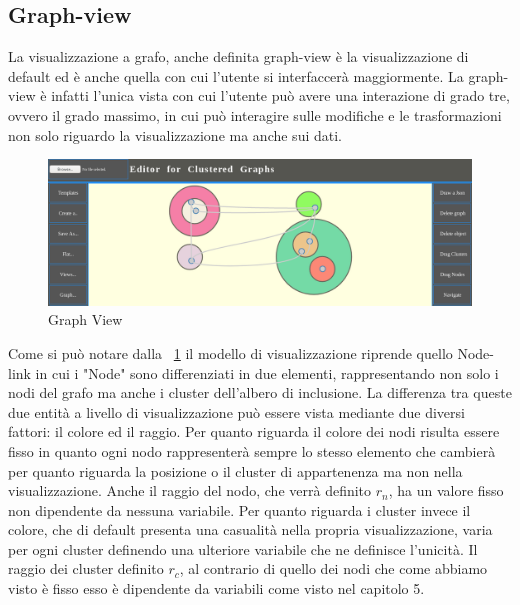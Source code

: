 {\subsection{Graph-view}
La visualizzazione a grafo, anche definita graph-view è la visualizzazione di default ed è anche quella con cui l'utente si interfaccerà maggiormente. La graph-view è infatti l'unica vista con cui l'utente può avere una interazione di grado tre, ovvero il grado massimo, in cui può interagire sulle modifiche e le trasformazioni non solo riguardo la visualizzazione ma anche sui dati.\\
\begin{figure}[!htb]
	\begin{center}
		\includegraphics[width=1 \linewidth]{figure/graphView}
	\end{center}
	\caption{Graph View\label{fig:graphView}}
\end{figure}
\newline
Come si può notare dalla \figurename~\ref{fig:graphView} il modello di visualizzazione riprende quello Node-link in cui i "Node" sono differenziati in due elementi, rappresentando non solo i nodi del grafo ma anche i cluster dell'albero di inclusione. La differenza tra queste due entità a livello di visualizzazione può essere vista mediante due diversi fattori: il colore ed il raggio.
Per quanto riguarda il colore dei nodi risulta essere fisso in quanto ogni nodo rappresenterà sempre lo stesso elemento che cambierà per quanto riguarda la posizione o il cluster di appartenenza ma non nella visualizzazione. Anche il raggio del nodo, che verrà definito $r_n$, ha un valore fisso non dipendente da nessuna variabile.
Per quanto riguarda i cluster invece il colore, che di default presenta una casualità nella propria visualizzazione, varia per ogni cluster definendo una ulteriore variabile che ne definisce l'unicità.
Il raggio dei cluster definito $r_c$, al contrario di quello dei nodi che come abbiamo visto è fisso esso è dipendente da variabili come visto nel capitolo 5.

}
